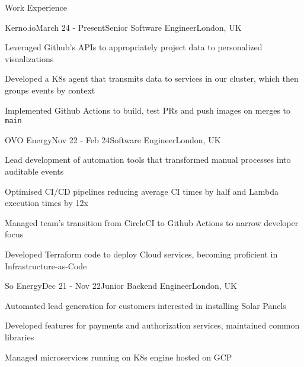 \documentclass{resume} %
\begin{document}
\begin{rSection}{Work Experience}
    \begin{rSubsection}{Kerno.io}{March 24 - Present}{Senior Software Engineer}{London, UK}
    \item Leveraged Github's APIs to appropriately project data to personalized visualizations
    \item Developed a K8s agent that transmits data to services in our cluster, which then groups events by context
    \item Implemented Github Actions to build, test PRs and push images on merges to \texttt{main}
  \end{rSubsection}
  \begin{rSubsection}{OVO Energy}{Nov 22 - Feb 24}{Software Engineer}{London, UK}
    \item Lead development of automation tools that transformed manual processes into auditable events
    \item Optimised CI/CD pipelines reducing average CI times by half and Lambda execution times by 12x 
    \item Managed team’s transition from CircleCI to Github Actions to narrow developer focus
    \item Developed Terraform code to deploy Cloud services, becoming proficient in Infrastructure-as-Code
  \end{rSubsection}
  \begin{rSubsection}{So Energy}{Dec 21 - Nov 22}{Junior Backend Engineer}{London, UK}
    \item Automated lead generation for customers interested in installing Solar Panels
    \item Developed features for payments and authorization services, maintained common libraries
    \item Managed microservices running on K8s engine hosted on GCP
  \end{rSubsection}

\end{rSection}
\end{document}
